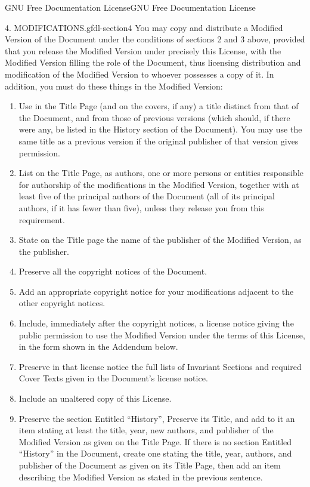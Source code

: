 \documentclass[10pt,]{book}
\numberwithin{equation}{section}
\begin{document}
\begin{appendixptx}{GNU Free Documentation License}{}{GNU Free Documentation License}{}{}
\begin{paragraphs}{4. MODIFICATIONS.}{gfdl-section4}
\hypertarget{p-541}{}%
You may copy and distribute a Modified Version of the Document under the conditions of sections 2 and 3 above, provided that you release the Modified Version under precisely this License, with the Modified Version filling the role of the Document, thus licensing distribution and modification of the Modified Version to whoever possesses a copy of it. In addition, you must do these things in the Modified Version:%
\leavevmode%
\begin{enumerate}[label=\Alph*.]
\item\hypertarget{li-25}{}\hypertarget{p-542}{}%
Use in the Title Page (and on the covers, if any) a title distinct from that of the Document, and from those of previous versions (which should, if there were any, be listed in the History section of the Document). You may use the same title as a previous version if the original publisher of that version gives permission.%
\item\hypertarget{li-26}{}\hypertarget{p-543}{}%
List on the Title Page, as authors, one or more persons or entities responsible for authorship of the modifications in the Modified Version, together with at least five of the principal authors of the Document (all of its principal authors, if it has fewer than five), unless they release you from this requirement.%
\item\hypertarget{li-27}{}\hypertarget{p-544}{}%
State on the Title page the name of the publisher of the Modified Version, as the publisher.%
\item\hypertarget{li-28}{}\hypertarget{p-545}{}%
Preserve all the copyright notices of the Document.%
\item\hypertarget{li-29}{}\hypertarget{p-546}{}%
Add an appropriate copyright notice for your modifications adjacent to the other copyright notices.%
\item\hypertarget{li-30}{}\hypertarget{p-547}{}%
Include, immediately after the copyright notices, a license notice giving the public permission to use the Modified Version under the terms of this License, in the form shown in the Addendum below.%
\item\hypertarget{li-31}{}\hypertarget{p-548}{}%
Preserve in that license notice the full lists of Invariant Sections and required Cover Texts given in the Document's license notice.%
\item\hypertarget{li-32}{}\hypertarget{p-549}{}%
Include an unaltered copy of this License.%
\item\hypertarget{li-33}{}\hypertarget{p-550}{}%
Preserve the section Entitled ``History'', Preserve its Title, and add to it an item stating at least the title, year, new authors, and publisher of the Modified Version as given on the Title Page. If there is no section Entitled ``History'' in the Document, create one stating the title, year, authors, and publisher of the Document as given on its Title Page, then add an item describing the Modified Version as stated in the previous sentence.%

\end{enumerate}
\end{paragraphs}
\end{appendixptx}
\end{document}
